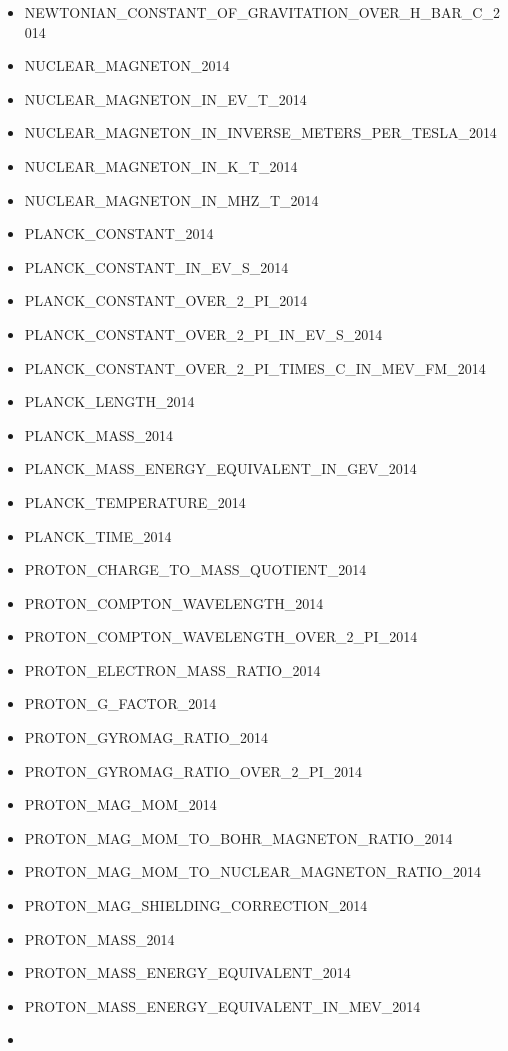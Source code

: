\begin{itemize}
  NEWTONIAN\_CONSTANT\_OF\_GRAVITATION\_2014
\item
  NEWTONIAN\_CONSTANT\_OF\_GRAVITATION\_OVER\_H\_BAR\_C\_2014
\item
  NUCLEAR\_MAGNETON\_2014
\item
  NUCLEAR\_MAGNETON\_IN\_EV\_T\_2014
\item
  NUCLEAR\_MAGNETON\_IN\_INVERSE\_METERS\_PER\_TESLA\_2014
\item
  NUCLEAR\_MAGNETON\_IN\_K\_T\_2014
\item
  NUCLEAR\_MAGNETON\_IN\_MHZ\_T\_2014
\item
  PLANCK\_CONSTANT\_2014
\item
  PLANCK\_CONSTANT\_IN\_EV\_S\_2014
\item
  PLANCK\_CONSTANT\_OVER\_2\_PI\_2014
\item
  PLANCK\_CONSTANT\_OVER\_2\_PI\_IN\_EV\_S\_2014
\item
  PLANCK\_CONSTANT\_OVER\_2\_PI\_TIMES\_C\_IN\_MEV\_FM\_2014
\item
  PLANCK\_LENGTH\_2014
\item
  PLANCK\_MASS\_2014
\item
  PLANCK\_MASS\_ENERGY\_EQUIVALENT\_IN\_GEV\_2014
\item
  PLANCK\_TEMPERATURE\_2014
\item
  PLANCK\_TIME\_2014
\item
  PROTON\_CHARGE\_TO\_MASS\_QUOTIENT\_2014
\item
  PROTON\_COMPTON\_WAVELENGTH\_2014
\item
  PROTON\_COMPTON\_WAVELENGTH\_OVER\_2\_PI\_2014
\item
  PROTON\_ELECTRON\_MASS\_RATIO\_2014
\item
  PROTON\_G\_FACTOR\_2014
\item
  PROTON\_GYROMAG\_RATIO\_2014
\item
  PROTON\_GYROMAG\_RATIO\_OVER\_2\_PI\_2014
\item
  PROTON\_MAG\_MOM\_2014
\item
  PROTON\_MAG\_MOM\_TO\_BOHR\_MAGNETON\_RATIO\_2014
\item
  PROTON\_MAG\_MOM\_TO\_NUCLEAR\_MAGNETON\_RATIO\_2014
\item
  PROTON\_MAG\_SHIELDING\_CORRECTION\_2014
\item
  PROTON\_MASS\_2014
\item
  PROTON\_MASS\_ENERGY\_EQUIVALENT\_2014
\item
  PROTON\_MASS\_ENERGY\_EQUIVALENT\_IN\_MEV\_2014
\item

\end{itemize}
